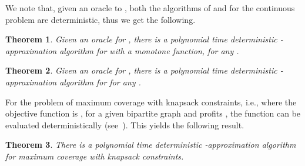 \documentclass[11pt]{article}
\newtheorem{theorem}{Theorem}[section]
\begin{document}
We note that,
given an oracle to , both the algorithms of \cite{Vo08} and \cite{LMNS09} for the
continuous problem are deterministic, thus we get
the following.

\begin{theorem}
\label{thm:det_alg}
Given an oracle for ,
there is a polynomial time deterministic  -approximation
algorithm for  with a monotone function, for any .
\end{theorem}

\begin{theorem}
\label{thm:det_alg_non_monotone}
Given an oracle for ,
there is a polynomial time deterministic  -approximation
algorithm for  for any .
\end{theorem}

For the problem of maximum coverage with  knapsack
constraints, i.e.,   where the objective function is
, for a given bipartite graph  and profits
, the function  can be evaluated deterministically
(see~\cite{as04}). This yields the following result.

\begin{theorem}
There is a polynomial time deterministic
-approximation algorithm for maximum coverage with
 knapsack constraints.
\end{theorem}
\end{document}
